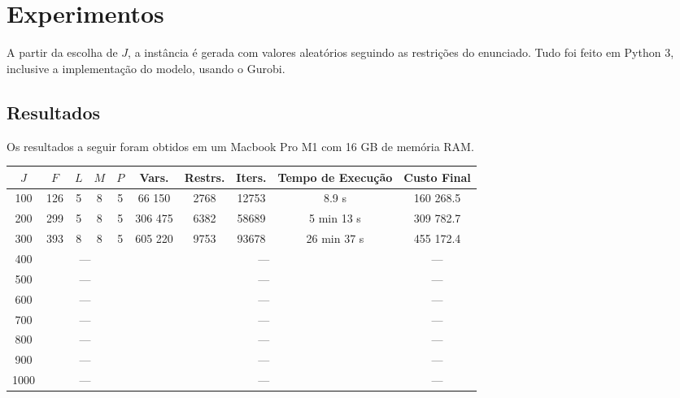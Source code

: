 \section{Experimentos}

    A partir da escolha de $J$, a instância é gerada com valores aleatórios seguindo as restrições do enunciado. Tudo foi feito em Python 3, inclusive a implementação do modelo, usando o Gurobi.

    \subsection{Resultados}

        Os resultados a seguir foram obtidos em um Macbook Pro M1 com 16 GB de memória RAM.

        \begin{table}[H]
            \centering
            \begin{tabular}{ccccc|cccc|c}
                \toprule\toprule
                $J$ & $F$ & $L$ & $M$ & $P$ & Vars. & Restrs. & Iters. & Tempo de Execução & Custo Final \\
                \midrule
                100 & 126 & 5 & 8 & 5 & 66 150 & 2768 & 12753 & 8.9 s & 160 268.5 \\
                200 & 299 & 5 & 8 & 5 & 306 475 & 6382 & 58689 & 5 min 13 s & 309 782.7 \\
                300 & 393 & 8 & 8 & 5 & 605 220 & 9753 & 93678 & 26 min 37 s & 455 172.4 \\
                400 & \multicolumn{4}{c|}{---} & \multicolumn{4}{c|}{---} & --- \\
                500 & \multicolumn{4}{c|}{---} & \multicolumn{4}{c|}{---} & --- \\
                600 & \multicolumn{4}{c|}{---} & \multicolumn{4}{c|}{---} & --- \\
                700 & \multicolumn{4}{c|}{---} & \multicolumn{4}{c|}{---} & --- \\
                800 & \multicolumn{4}{c|}{---} & \multicolumn{4}{c|}{---} & --- \\
                900 & \multicolumn{4}{c|}{---} & \multicolumn{4}{c|}{---} & --- \\
                1000 & \multicolumn{4}{c|}{---} & \multicolumn{4}{c|}{---} & --- \\
                \bottomrule\bottomrule
            \end{tabular}
        \end{table}
